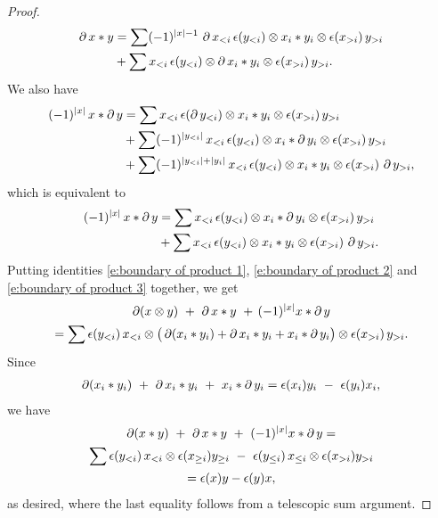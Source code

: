 \begin{proof}
\begin{equation}
\begin{split}
			\operatorname{\partial} x \ast y & =
			\sum (-1)^{|x|-1} \, \operatorname{\partial} x_{<i}\, \epsilon(y_{<i}) \otimes x_i \ast y_i \otimes \epsilon(x_{>i})\, y_{>i} \\ & +
			\sum x_{<i}\, \epsilon(y_{<i}) \otimes \operatorname{\partial} x_i \ast y_i \otimes \epsilon(x_{>i})\, y_{>i}.
		\end{split}
	\end{equation}
	We also have
	\begin{align*}
		(-1)^{|x|} \, x \ast \operatorname{\partial} y & =
		\sum x_{<i} \, \epsilon(\operatorname{\partial} y_{<i}) \otimes x_i \ast y_i \otimes \epsilon(x_{>i})\, y_{>i} \\ & +
		\sum (-1)^{|y_{<i}|} \, x_{<i}\, \epsilon(y_{<i}) \otimes x_i \ast \operatorname{\partial} y_i \otimes \epsilon(x_{>i}) \, y_{>i} \\ & +
		\sum (-1)^{|y_{<i}| + |y_i|} \, x_{<i}\, \epsilon(y_{<i}) \otimes x_i \ast y_i \otimes \epsilon(x_{>i}) \, \operatorname{\partial} y_{>i},
	\end{align*}
	which is equivalent to
	\begin{equation} \label{e:boundary of product 3}
		\begin{split}
			(-1)^{|x|} \, x \ast \operatorname{\partial} y & =
			\sum x_{<i} \, \epsilon(y_{<i}) \otimes x_i \ast \operatorname{\partial} y_i \otimes \epsilon(x_{>i})\, y_{>i} \\ & +
			\sum x_{<i}\, \epsilon(y_{<i}) \otimes x_i \ast y_i \otimes \epsilon(x_{>i})\, \operatorname{\partial} y_{>i}.
		\end{split}
	\end{equation}
	Putting identities \eqref{e:boundary of product 1}, \eqref{e:boundary of product 2} and \eqref{e:boundary of product 3} together, we get
	\begin{multline*}
		\operatorname{\partial} (x \otimes y) \ +\ \operatorname{\partial} x \ast y\ +\, (-1)^{|x|}x \ast \operatorname{\partial} y \\
		= \sum \epsilon(y_{<i})\, x_{<i} \otimes \big(\operatorname{\partial}(x_i \ast y_i) + \operatorname{\partial} x_i \ast y_i + x_i \ast \operatorname{\partial} y_i\big) \otimes \epsilon(x_{>i})\, y_{>i}.
	\end{multline*}
	Since
	\begin{align*}
		\operatorname{\partial}(x_i \ast y_i)\ +\ \operatorname{\partial} x_i \ast y_i\ +\ x_i \ast \operatorname{\partial} y_i =
		\epsilon(x_i)y_i\ -\ \epsilon(y_i)x_i,
	\end{align*}
	we have
	\begin{multline*}
		\operatorname{\partial} (x \ast y) \ +\ \operatorname{\partial} x \ast y\ +\ (-1)^{|x|}x \ast \operatorname{\partial} y = \\
		\sum \epsilon(y_{<i}) \, x_{<i} \otimes \epsilon(x_{\geq i}) y_{\geq i}\ -\
		\epsilon(y_{\leq i}) \, x_{\leq i} \otimes \epsilon(x_{>i}) y_{>i} \\ =
		\epsilon(x)y - \epsilon(y)x,
	\end{multline*}
	as desired, where the last equality follows from a telescopic sum argument.
\end{proof}


